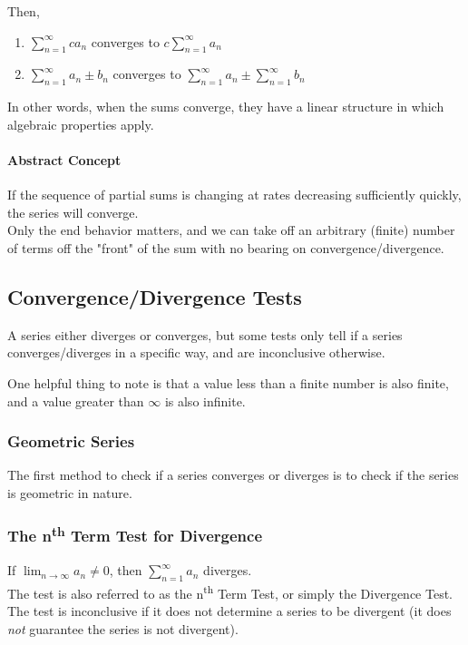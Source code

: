 \documentclass{article}
\begin{document}
Then,
\begin{enumerate}
    \item $\sum_{n=1}^{\infty} ca_n$ converges to $c\sum_{n=1}^{\infty} a_n$
    \item $\sum_{n=1}^{\infty} a_n \pm b_n$ converges to $\sum_{n=1}^{\infty} a_n \pm \sum_{n=1}^{\infty} b_n$
\end{enumerate}

In other words, when the sums converge, they have a linear structure in which algebraic properties apply.

\paragraph{Abstract Concept} If the sequence of partial sums is changing at rates decreasing sufficiently quickly, the series will converge.\\
Only the end behavior matters, and we can take off an arbitrary (finite) number of terms off the "front" of the sum with no bearing on convergence/divergence.

\subsection{Convergence/Divergence Tests}
A series either diverges or converges, but some tests only tell if a series converges/diverges in a specific way, and are inconclusive otherwise.

One helpful thing to note is that a value less than a finite number is also finite, and a value greater than $\infty$ is also infinite.

\subsubsection{Geometric Series} The first method to check if a series converges or diverges is to check if the series is geometric in nature.

\subsubsection{\texorpdfstring{The n\textsuperscript{th} Term Test for Divergence}{The Nth Term Test}} If $\lim_{n \to \infty} a_n \ne 0$, then $\sum_{n=1}^{\infty} a_n$ diverges.\\
The test is also referred to as the n\textsuperscript{th} Term Test, or simply the Divergence Test.\\
The test is inconclusive if it does not determine a series to be divergent (it does \emph{not} guarantee the series is not divergent).
\end{document}

